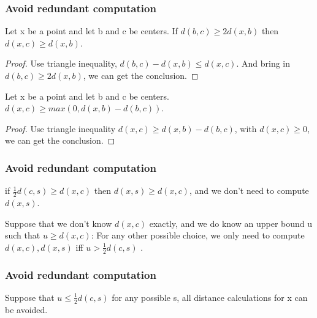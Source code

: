 \documentclass[9pt]{beamer}
\newcommand{\ccp}[1]{{\color{purple}#1}}
\begin{document}
\begin{frame}
	\frametitle{Avoid redundant computation}
	\begin{lemma}
		Let x be a point and let b and c be centers. If $d(b, c) \ge 2d(x,b)$ then $d(x,c) \ge d(x,b)$.
	\end{lemma}
	\begin{proof}
		Use triangle inequality, $d(b,c) - d(x,b)\le d(x,c)$. And bring in $d(b, c) \ge 2d(x,b)$, we can get the conclusion.
	\end{proof}
	\pause
	\begin{lemma}
		Let x be a point and let b and c be centers. $d(x,c) \ge max(0, d(x,b)-d(b,c))$.
	\end{lemma}
	\begin{proof}
		Use triangle inequality $d(x,c) \ge d(x,b)-d(b,c)$, with $d(x,c) \ge 0$, we can get the conclusion.
	\end{proof}
\end{frame}

\begin{frame}
	\frametitle{Avoid redundant computation}
	\begin{corollary}
		if $\frac{1}{2}d(c, s) \ge d(x,c)$ then $d(x, s) \ge d(x, c)$, and we \ccp{don't need to compute $d(x,s)$.}
	\end{corollary}
	\pause
	\begin{corollary}
		Suppose that we don't know $d(x,c)$ exactly, and we do know an upper bound u such that $u \ge d(x,c)$: For any other possible choice, \ccp{we only need to compute $d(x, c), d(x, s)$ iff $u > \frac{1}{2}d(c, s)$ .}
	\end{corollary}

\end{frame}

\begin{frame}
	\frametitle{Avoid redundant computation}
	\begin{corollary}
		Suppose that $u \le \frac{1}{2}d(c, s)$ for any possible s, all distance calculations for x can be avoided.
	\end{corollary}
\end{frame}
\end{document}
